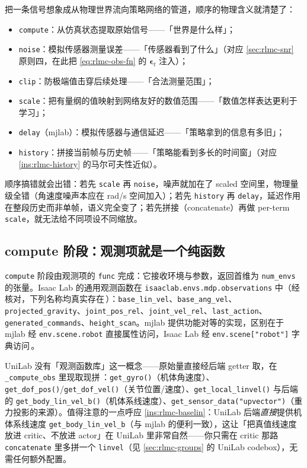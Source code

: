 \begin{insight}\label{ins:rlmc-pipeline}
把一条信号想象成从物理世界流向策略网络的管道，顺序的物理含义就清楚了：
\begin{itemize}
  \item \texttt{compute}：从仿真状态提取原始信号——「世界是什么样」；
  \item \texttt{noise}：模拟传感器测量误差——「传感器看到了什么」（对应 \cref{sec:rlmc-snr} 原则四，在此把 \cref{eq:rlmc-obs-fn} 的 $\boldsymbol\epsilon_t$ 注入）；
  \item \texttt{clip}：防极端值击穿后续处理——「合法测量范围」；
  \item \texttt{scale}：把有量纲的值映射到网络友好的数值范围——「数值怎样表达更利于学习」；
  \item \texttt{delay}（mjlab）：模拟传感器与通信延迟——「策略拿到的信息有多旧」；
  \item \texttt{history}：拼接当前帧与历史帧——「策略能看到多长的时间窗」（对应 \cref{ins:rlmc-history} 的马尔可夫性近似）。
\end{itemize}
顺序搞错就会出错：若先 \texttt{scale} 再 \texttt{noise}，噪声就加在了 scaled 空间里，物理量级全错（角速度噪声本应在 rad/s 空间加入）；若先 \texttt{history} 再 \texttt{delay}，延迟作用在整段历史而非单帧，语义完全变了；若先拼接（concatenate）再做 per-term \texttt{scale}，就无法给不同项设不同缩放。
\end{insight}

\subsection{compute 阶段：观测项就是一个纯函数}
\label{sec:rlmc-compute}

\verb|compute| 阶段由观测项的 \verb|func| 完成：它接收环境与参数，返回首维为 \verb|num_envs| 的张量。Isaac Lab 的通用观测函数在 \verb|isaaclab.envs.mdp.observations| 中（经核对，下列名称均真实存在\,\cite{isaaclab2024}）：\verb|base_lin_vel|、\verb|base_ang_vel|、\verb|projected_gravity|、\verb|joint_pos_rel|、\verb|joint_vel_rel|、\verb|last_action|、\verb|generated_commands|、\verb|height_scan|。mjlab 提供功能对等的实现，区别在于 mjlab 经 \verb|env.scene.robot| 直接属性访问，Isaac Lab 经 \verb|env.scene["robot"]| 字典访问\,\cite{mjlab2026}。

UniLab 没有「观测函数库」这一概念——原始量直接经后端 getter 取，在 \verb|_compute_obs| 里现取现拼\,\cite{unilab2026}：\verb|get_gyro()|（机体角速度）、\verb|get_dof_pos()|/\verb|get_dof_vel()|（关节位置/速度）、\verb|get_local_linvel()| 与后端的 \verb|get_body_lin_vel_b()|（机体系线速度）、\verb|get_sensor_data("upvector")|（重力投影的来源）。值得注意的一点呼应 \cref{ins:rlmc-baselin}：UniLab 后端\emph{直接}提供机体系线速度 \verb|get_body_lin_vel_b|（与 mjlab 的便利一致），这让「把真值线速度放进 critic、不放进 actor」在 UniLab 里非常自然——你只需在 critic 那路 \verb|concatenate| 里多拼一个 \verb|linvel|（见 \cref{sec:rlmc-groups} 的 UniLab codebox），无需任何额外配置。

